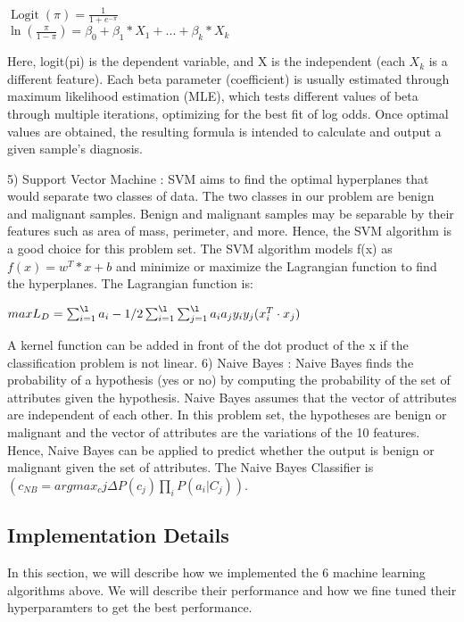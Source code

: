 \documentclass[conference]{IEEEtran}
\begin{document}
\begin{center}
    $\operatorname{Logit}(\pi) = \frac{1}{1+e^{-\pi}}$\\
    $\operatorname{ln}(\frac{\pi}{1-\pi}) = \beta_0 + \beta_1*X_1 + ... + \beta_k*X_k$
\end{center}

Here, logit(pi) is the dependent variable, and X is the independent (each $X_k$ is a different feature). Each beta parameter (coefficient) is usually estimated through maximum likelihood estimation (MLE), which tests different values of beta through multiple iterations, optimizing for the best fit of log odds. Once optimal values are obtained, the resulting formula is intended to calculate and output a given sample's diagnosis.

5) Support Vector Machine : SVM aims to find the optimal hyperplanes that would separate two classes of data. The two classes in our problem are benign and malignant samples. Benign and malignant samples may be separable by their features such as area of mass, perimeter, and more. Hence, the SVM algorithm is a good choice for this problem set. The SVM algorithm models f(x) as \(f(x) = w^T*x + b\) and minimize or maximize the Lagrangian function to find the hyperplanes. The Lagrangian function is:
\begin{center}
    \(max L_D = \sum_{i=1}^{\l}a_i - 1/2\sum_{i=1}^{\l}\sum_{j=1}^{\l}a_i a_j y_i y_j(x_i^T \cdot x_j)\)
\end{center}
A kernel function can be added in front of the dot product of the x if the classification problem is not linear. 
6) Naive Bayes : Naive Bayes finds the probability of a hypothesis (yes or no) by computing the probability of the set of attributes given the hypothesis. Naive Bayes assumes that the vector of attributes are independent of each other. In this problem set, the hypotheses are benign or malignant and the vector of attributes are the variations of the 10 features. Hence, Naive Bayes can be applied to predict whether the output is benign or malignant given the set of attributes. The Naive Bayes Classifier is $(c_{NB} = argmax_cj\Delta P(c_j) \prod_i P(a_i |C_j))$. 

\subsection{Implementation Details}
In this section, we will describe how we implemented the 6 machine learning algorithms above. We will describe their performance and how we fine tuned their hyperparamters to get the best performance. 
\end{document}
